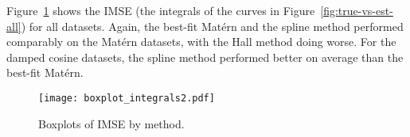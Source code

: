 Figure~\ref{fig:boxplot-integrals} shows the IMSE (the integrals of the curves in Figure~\ref{fig:true-vs-est-all}) for all datasets. Again, the best-fit Mat\'{e}rn and the spline method performed comparably on the Mat\'{e}rn datasets, with the Hall method doing worse. For the damped cosine datasets, the spline method performed better on average than the best-fit Mat\'{e}rn.

\begin{figure}[htbp]
	\centering
	\texttt{[image: boxplot\_integrals2.pdf]}
	\caption{Boxplots of IMSE by method.}
	\label{fig:boxplot-integrals}
\end{figure}

